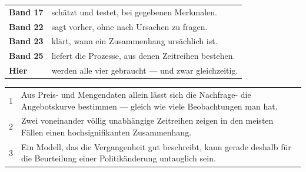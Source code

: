 \begin{merksatz}
\begin{center}
{\small
\renewcommand{\arraystretch}{1.5}
\begin{tabular}{@{}P{2.2cm}P{6.4cm}@{}}
\toprule
\textbf{Band 17} & schätzt und testet, bei gegebenen Merkmalen.\\
\textbf{Band 22} & sagt vorher, ohne nach Ursachen zu fragen.\\
\textbf{Band 23} & klärt, wann ein Zusammenhang ursächlich ist.\\
\textbf{Band 25} & liefert die Prozesse, aus denen Zeitreihen bestehen.\\
\textbf{Hier} & werden alle vier gebraucht --- und zwar gleichzeitig.\\
\bottomrule
\end{tabular}}
\end{center}

\begin{center}
\begin{minipage}{0.88\textwidth}
\end{minipage}
\end{center}
\end{merksatz}

\begin{merksatz}
\begin{center}
{\small
\renewcommand{\arraystretch}{1.55}
\begin{tabular}{@{}P{1.0cm}P{7.4cm}@{}}
\toprule
$1$ & Aus Preis- und Mengendaten allein lässt sich  die Nachfrage-  die Angebotskurve bestimmen --- gleich wie viele Beobachtungen man hat. \\
$2$ & Zwei voneinander völlig unabhängige Zeitreihen zeigen in den meisten Fällen einen hochsignifikanten Zusammenhang. \\
$3$ & Ein Modell, das die Vergangenheit gut beschreibt, kann gerade deshalb für die Beurteilung einer Politikänderung untauglich sein. \\
\bottomrule
\end{tabular}}
\end{center}

\begin{center}
\begin{minipage}{0.88\textwidth}
\end{minipage}
\end{center}
\end{merksatz}

